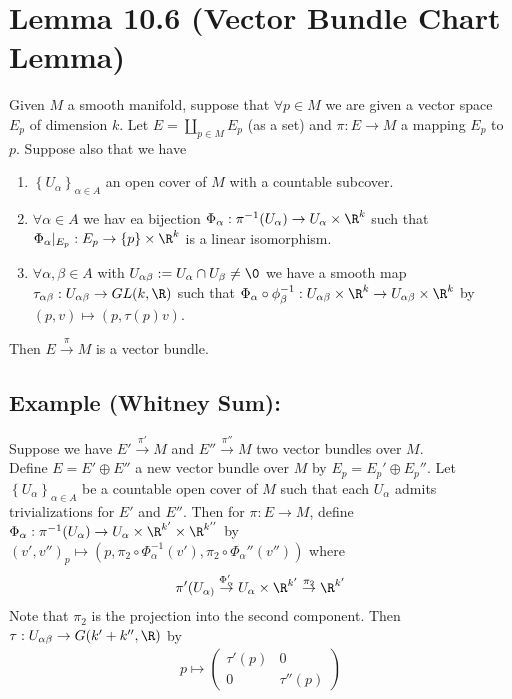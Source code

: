 \documentclass[11pt]{article}
\begin{document}
\section*{Lemma 10.6 (Vector Bundle Chart Lemma)}
\label{sec:orgd0e318e}
Given \(M\) a smooth manifold, suppose that \(\forall p\in M\) we are given a vector space \(E_{p}\) of dimension \(k\). Let \(E=\coprod_{p\in M}E_{p}\) (as a set) and \(\pi:E\to M\) a mapping \(E_{p}\) to \(p\). Suppose also that we have\\
\begin{enumerate}
\item \(\left\{ U_{\alpha} \right\}_{\alpha\in A}\) an open cover of \(M\) with a countable subcover.\\
\item \(\forall\alpha\in A\) we hav ea bijection \(\Phi_{\alpha}:\pi^{-1}(U_{\alpha})\to U_{\alpha}\times\R^{k}\) such that \(\Phi_{\alpha}|_{E_{p}}:E_{p}\to\{p\}\times\R^{k}\) is a linear isomorphism.\\
\item \(\forall\alpha,\beta\in A\) with \(U_{\alpha\beta}:=U_{\alpha}\cap U_{\beta}\neq\0\) we have a smooth map \(\tau_{\alpha\beta}:U_{\alpha\beta}\to GL(k,\R)\) such that \(\Phi_{\alpha}\circ\phi^{-1}_{\beta}:U_{\alpha\beta}\times\R^{k}\to U_{\alpha\beta}\times\R^{k}\) by \((p,v)\mapsto(p,\tau(p)v)\).\\
\end{enumerate}

Then \(E\overset{\pi}{\to}M\) is a vector bundle.\\
\subsection*{Example (Whitney Sum):}
\label{sec:org10d4a9a}
Suppose we have \(E'\overset{\pi'}{\to}M\) and \(E''\overset{\pi''}{\to}M\) two vector bundles over \(M\).\\
Define \(E=E'\oplus E''\) a new vector bundle over \(M\) by \(E_{p}=E_{p}'\oplus E_{p}''\). Let \(\left\{ U_{\alpha} \right\}_{\alpha\in A}\) be a countable open cover of \(M\) such that each \(U_{\alpha}\) admits trivializations for \(E'\) and \(E''\). Then for \(\pi:E\to M\), define \(\Phi_{\alpha}:\pi^{-1}(U_{\alpha})\to U_{\alpha}\times\R^{k'}\times\R^{k''}\) by \((v',v'')_{p}\mapsto(p,\pi_{2}\circ\Phi_{\alpha}^{-1}(v'),\pi_{2}\circ\Phi_{\alpha}''(v''))\) where\\
\begin{align*}
  \pi'(U_{\alpha)}\overset{\Phi_{\alpha}'}{\to}U_{\alpha}\times\R^{k'}\overset{\pi_{2}}{\to}\R^{k'}
\end{align*}
Note that \(\pi_{2}\) is the projection into the second component. Then \(\tau:U_{\alpha\beta}\to G(k'+k'',\R)\) by\\
\begin{align*}
  p\mapsto
  \begin{pmatrix}
    \tau'(p) & 0 \\
    0 & \tau''(p)
  \end{pmatrix}
\end{align*}
\end{document}
